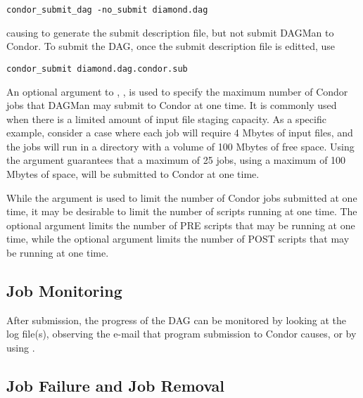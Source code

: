 \begin{verbatim}
condor_submit_dag -no_submit diamond.dag
\end{verbatim}
causing  to generate the submit description file,
but not submit DAGMan to Condor.
To submit the DAG, once the submit description file is editted,
use

\begin{verbatim}
condor_submit diamond.dag.condor.sub
\end{verbatim}

An optional argument to , , 
is used to specify the maximum number of Condor jobs that DAGMan may
submit to Condor at one time.
It is commonly used when 
there is a limited amount of input file staging capacity.
As a specific example, consider a case where each job will
require 4 Mbytes of input files,
and the jobs will run in a directory with a volume of 100 Mbytes
of free space.
Using the argument  guarantees that a maximum
of 25 jobs, using a maximum of 100 Mbytes of space,
will be submitted to Condor at one time.

While the  argument is used to limit the number
of Condor jobs submitted at one time,
it may be desirable to limit the number of scripts running
at one time.
The optional  argument limits the number of PRE
scripts that may be running at one time,
while the optional  argument limits the number of POST
scripts that may be running at one time.

\subsection{Job Monitoring}

After submission, the progress of the DAG can be monitored
by looking at the log file(s),
observing the e-mail that program submission to Condor causes,
or by using  .

\subsection{Job Failure and Job Removal}

